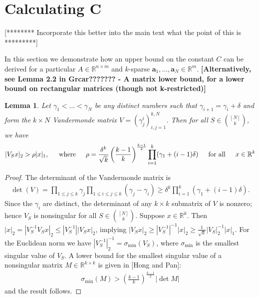 \documentclass[journal, onecolumn]{IEEEtran}
\newtheorem{lemma}{Lemma}
\begin{document}

\section{Calculating C}

[********  Incorporate this better into the main text what the point of this is *********]

In this section we demonstrate how an upper bound on the constant $C$ can be derived for a particular $A \in \mathbb{R}^{n \times m}$ and $k$-sparse $\mathbf{a}_1, \ldots, \mathbf{a}_N \in \mathbb{R}^m$. \textbf{[Alternatively, see Lemma 2.2 in Grcar??????? - A matrix lower bound, for a lower bound on rectangular matrices (though not k-restricted)]}


\begin{lemma}\label{MatrixLowerBoundLemma}
Let $\gamma_1 < \ldots < \gamma_N$ be any distinct numbers such that $\gamma_{i+1} = \gamma_i + \delta$ and form the $k \times N$ Vandermonde matrix $V = (\gamma^i_j)^{k,N}_{i,j=1}$. Then for all $S \in {[N] \choose k}$, we have
\begin{align}
	|V_S x|_2 > \rho |x|_1, \indent \text{where} \indent \rho = \frac{\delta^k}{\sqrt{k}} \left( \frac{k-1}{k} \right)^\frac{k-1}{2} \prod_{i = 1}^k (\gamma_1 + (i-1)\delta) \indent \text{for all} \indent x \in \mathbb{R}^k
\end{align}
\end{lemma}

\begin{proof} 
The determinant of the Vandermonde matrix is
\begin{align}
	\det(V) = \prod_{1 \leq j \leq k} \gamma_j \prod_{1 \leq i \leq j \leq k} (\gamma_j - \gamma_i) \geq \delta^k \prod_{i = 1}^k (\gamma_1 + (i-1)\delta).
\end{align}	
Since the $\gamma_i$ are distinct, the determinant of any $k \times k$ submatrix of $V$ is nonzero; hence $V_S$ is nonsingular for all $S \in {[N] \choose k}$. Suppose $x \in \mathbb{R}^k$. Then $|x|_2 = |V_S^{-1} V_S x|_2 \leq |V_S^{-1}| |V_S x|_2$, implying $|V_Sx|_2 \geq |V_S^{-1}|^{-1}|x|_2 \geq \frac{1}{\sqrt{k}} |V_S|_2^{-1}|x|_1$. For the Euclidean norm we have $|V_S^{-1}|_2^{-1} = \sigma_{\min}(V_S)$, where $\sigma_{\min}$ is the smallest singular value of $V_S$. A lower bound for the smallest singular value of a nonsingular matrix $M \in \mathbb{R}^{k \times k}$ is given in [Hong and Pan]:
\begin{align}
	\sigma_{\min}(M) > \left( \frac{k-1}{k} \right)^\frac{k-1}{2} |\det M|
\end{align}
%
and the result follows. 
\end{proof}
\end{document}
